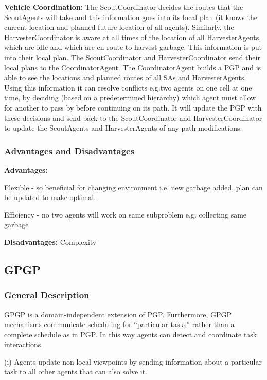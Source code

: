 \textbf{Vehicle Coordination:} The ScoutCoordinator decides the routes that the ScoutAgents will take and this information goes into its local plan (it knows the current location and planned future location of all agents). Similarly, the HarvesterCoordinator is aware at all times of the location of all HarvesterAgents, which are idle and which are en route to harvest garbage. This information is put into their local plan. The ScoutCoordinator and HarvesterCoordinator send their local plans to the CoordinatorAgent. The CoordinatorAgent builds a PGP and is able to see the locations and planned routes of all SAs and HarvesterAgents. Using this information it can resolve conflicts e.g.two agents on one cell at one time, by deciding (based on a predetermined hierarchy) which agent must allow for another to pass by before continuing on its path. It will update the PGP with these decisions and send back to the ScoutCoordinator and HarvesterCoordinator to update the ScoutAgents and HarvesterAgents of any path modifications.

\subsubsection{Advantages and Disadvantages}

\textbf{Advantages:}

Flexible - so beneficial for changing environment i.e. new garbage added, plan can be updated to make optimal.

Efficiency - no two agents will work on same subproblem e.g. collecting same garbage

\textbf{Disadvantages:} Complexity

\subsection{GPGP}

\subsubsection{General Description}

GPGP is a domain-independent extension of PGP. Furthermore, GPGP mechanisms communicate scheduling for ``particular tasks'' \cite{Decker1995} rather than a complete schedule as in PGP. In this way agents can detect and coordinate task interactions. 

(i) Agents update non-local viewpoints by sending information about a particular task to all other agents that can also solve it.

